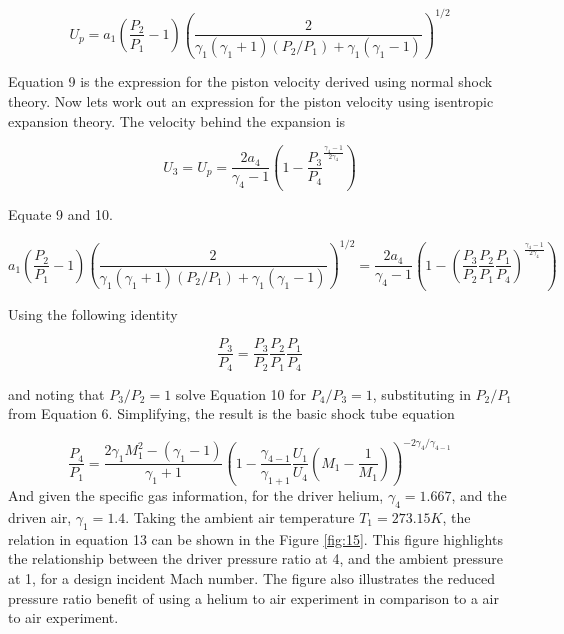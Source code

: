 \begin{equation}
U_p = a_1\left(\frac{P_2}{P_1} - 1\right)\left(\frac{2}{\gamma_1(\gamma_1 + 1)(P_2/P_1) + \gamma_1(\gamma_1 - 1)}\right)^{1/2}
\end{equation}

Equation 9 is the expression for the piston velocity derived using normal shock theory. Now lets work out an expression for the piston velocity using isentropic expansion theory. The velocity behind the expansion is

\begin{equation}
U_3 = U_p = \frac{2a_4}{\gamma_4 - 1}\left(1 - \frac{P_3}{P_4}^{\frac{\gamma_4 - 1}{2\gamma_4}}\right)
\end{equation}

Equate 9 and 10.

\begin{equation}
a_1\left(\frac{P_2}{P_1} - 1\right)\left(\frac{2}{\gamma_1(\gamma_1 + 1)(P_2/P_1) + \gamma_1(\gamma_1 - 1)}\right)^{1/2} = \frac{2a_4}{\gamma_4 - 1}\left(1 - \left(\frac{P_3}{P_2}\frac{P_2}{P_1}\frac{P_1}{P_4}\right)^{\frac{\gamma_4 - 1}{2\gamma_4}}\right)
\end{equation}

Using the following identity

\begin{equation}
\frac{P_3}{P_4}=\frac{P_3}{P_2}\frac{P_2}{P_1}\frac{P_1}{P_4}
\end{equation}

and noting that $P_3/P_2 = 1$ solve Equation 10 for $P_4/P_3 = 1$, substituting in $P_2/P_1$ from Equation 6. Simplifying, the result is the basic shock tube equation

\begin{equation}
\frac{P_4}{P_1} = \frac{2\gamma_1M_1^2 - (\gamma_1 - 1)}{\gamma_1 + 1}\left(1 - \frac{\gamma_{4-1}}{\gamma_{1+1}}\frac{U_1}{U_4}\left(M_1 - \frac{1}{M_1}\right)\right)^{-2\gamma_4/\gamma_{4-1}}
\end{equation}
And given the specific gas information, for the driver helium, $\gamma_4 = 1.667$, and the driven air, $\gamma_1 = 1.4$. Taking the ambient air temperature $T_1 = 273.15K$, the relation in equation 13 can be shown in the Figure \ref{fig:15}. This figure highlights the relationship between the driver pressure ratio at 4, and the ambient pressure at 1, for a design incident Mach number. The figure also illustrates the reduced pressure ratio benefit of using a helium to air experiment in comparison to a air to air experiment. 
	


